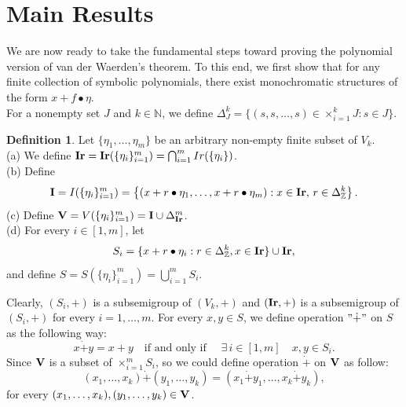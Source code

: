 \documentclass{amsart}
\theoremstyle{definition}
\newtheorem{definition}[theorem]{Definition}
\theoremstyle{remark}
\numberwithin{equation}{section}
\newcommand{\Ir}{{\bf{Ir}}}
\newcommand{\V}{{\bf{V}}}
\newcommand{\I}{{\bf{I}}}
\begin{document}
\section{Main Results}
We are now ready to take the fundamental steps toward proving the polynomial version of van der Waerden's theorem. To this end, we first show that for any finite collection of symbolic polynomials, there exist monochromatic structures of the form \( x + f \bullet \eta \).\\
For a nonempty set $J$ and $k\in\mathbb{N}$, we define $\Delta^k_J=\{(s,s,\ldots,s)\in \times_{i=1}^kJ:s\in J\}$.
\begin{definition}
	Let $\{\eta_1,\ldots,\eta_m\}$ be an arbitrary non-empty finite subset of $V_k$.\\
	(a) We define $\Ir=\Ir(\{\eta_i\}_{i=1}^m)=\bigcap_{i=1}^m Ir(\{\eta_i\})$.\\
	(b) Define 
	\[
	\I=I(\{\eta_i\}_{i=1}^m)=\left\{ \left(x + r \bullet \eta_1, \ldots, x  + r \bullet \eta_m \right) : x \in \Ir,\,r \in \Delta_{\mathbb{Z}}^k\right\}.
	\]
	(c) Define $\V=V(\{\eta_i\}_{i=1}^m) =\I \cup \Delta_{\Ir}^m$.\\
	(d) For every $i\in[1,m]$, let
	\[
	S_i=\{x+r\bullet \eta_i:r\in\Delta_{\mathbb{Z}}^k, x\in \Ir\}\cup\Ir, 
	\]
	and define $S=S(\{\eta_i\}_{i=1}^m)=\bigcup_{i=1}^mS_i$.
\end{definition}
Clearly, $(S_i,+)$ is a subsemigroup of $(V_k,+)$  and \((\Ir,+)\) is a subsemigroup of \((S_i,+)\) for every $i=1,\ldots,m$. For every $x,y\in S$, we define operation $"\dot{+}"$ on $S$ as the following way:
\[
x\dot{+}y=x+y\quad\mbox{if and only if }\quad\exists\, i\in[1,m]\quad x,y\in S_i.
\]
Since $\V$ is a subset of $\times_{i=1}^mS_i$, so we could define operation $\dot{+}$ on $\V$ as follow: 
\[
(x_1,\dots,x_k)\dot{+}(y_1,\ldots,y_k)=(x_1\dot{+}y_1,\dots,x_k\dot{+}y_k),
\]
for every $(x_1,\dots,x_k),(y_1,\ldots,y_k)\in \V$. 
\end{document}
